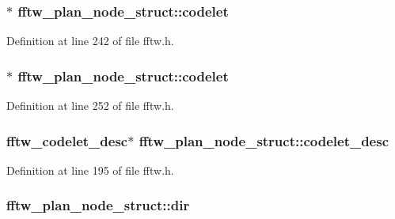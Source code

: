 \subsubsection[{\texorpdfstring{codelet}{codelet}}]{$\ast$ fftw\+\_\+plan\+\_\+node\+\_\+struct\+::codelet}\hypertarget{structfftw__plan__node__struct_a4e1eb660036c73926ccc592f68a554c6}{}\label{structfftw__plan__node__struct_a4e1eb660036c73926ccc592f68a554c6}


Definition at line 242 of file fftw.\+h.

\subsubsection[{\texorpdfstring{codelet}{codelet}}]{$\ast$ fftw\+\_\+plan\+\_\+node\+\_\+struct\+::codelet}\hypertarget{structfftw__plan__node__struct_a07acad07e31c415d9ab0445bb79e0127}{}\label{structfftw__plan__node__struct_a07acad07e31c415d9ab0445bb79e0127}


Definition at line 252 of file fftw.\+h.

\subsubsection[{\texorpdfstring{codelet\+\_\+desc}{codelet_desc}}]{ {\bf fftw\+\_\+codelet\+\_\+desc}$\ast$ fftw\+\_\+plan\+\_\+node\+\_\+struct\+::codelet\+\_\+desc}\hypertarget{structfftw__plan__node__struct_a7cb707dc27fb4779fbd0ee9cb4d7efd9}{}\label{structfftw__plan__node__struct_a7cb707dc27fb4779fbd0ee9cb4d7efd9}


Definition at line 195 of file fftw.\+h.

\subsubsection[{\texorpdfstring{dir}{dir}}]{ fftw\+\_\+plan\+\_\+node\+\_\+struct\+::dir}\hypertarget{structfftw__plan__node__struct_a3e47d4ee7b8ecddc6dc465409e8c038a}{}\label{structfftw__plan__node__struct_a3e47d4ee7b8ecddc6dc465409e8c038a}


